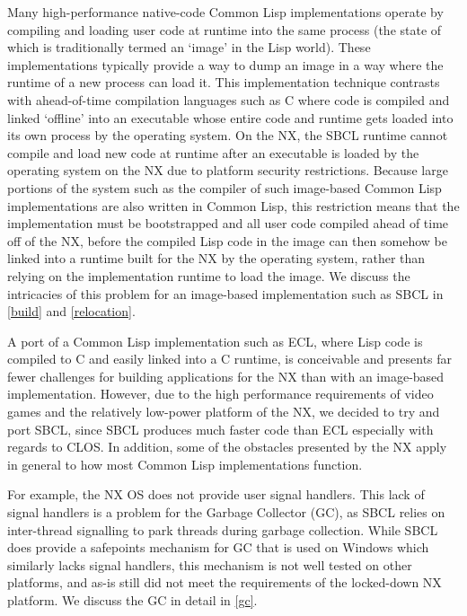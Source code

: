 \documentclass[format=sigconf]{acmart}
\begin{document}
Many high-performance native-code Common Lisp implementations operate by compiling and loading user code at runtime into the same process (the state of which is traditionally termed an `image' in the Lisp world). These implementations typically provide a way to dump an image in a way where the runtime of a new process can load it. This implementation technique contrasts with ahead-of-time compilation languages such as C where code is compiled and linked `offline' into an executable whose entire code and runtime gets loaded into its own process by the operating system. On the NX, the SBCL runtime cannot compile and load new code at runtime after an executable is loaded by the operating system on the NX due to platform security restrictions. Because large portions of the system such as the compiler of such image-based Common Lisp implementations are also written in Common Lisp, this restriction means that the implementation must be bootstrapped and all user code compiled ahead of time off of the NX, before the compiled Lisp code in the image can then somehow be linked into a runtime built for the NX by the operating system, rather than relying on the implementation runtime to load the image. We discuss the intricacies of this problem for an image-based implementation such as SBCL in \autoref{build} and \autoref{relocation}.

A port of a Common Lisp implementation such as ECL\cite{attardi1994embeddable}, where Lisp code is compiled to C and easily linked into a C runtime, is conceivable and presents far fewer challenges for building applications for the NX than with an image-based implementation. However, due to the high performance requirements of video games and the relatively low-power platform of the NX, we decided to try and port SBCL, since SBCL produces much faster code than ECL especially with regards to CLOS. In addition, some of the obstacles presented by the NX apply in general to how most Common Lisp implementations function.

For example, the NX OS does not provide user signal handlers. This lack of signal handlers is a problem for the Garbage Collector (GC), as SBCL relies on inter-thread signalling to park threads during garbage collection. While SBCL does provide a safepoints mechanism for GC that is used on Windows which similarly lacks signal handlers, this mechanism is not well tested on other platforms, and as-is still did not meet the requirements of the locked-down NX platform. We discuss the GC in detail in \autoref{gc}.
\end{document}
